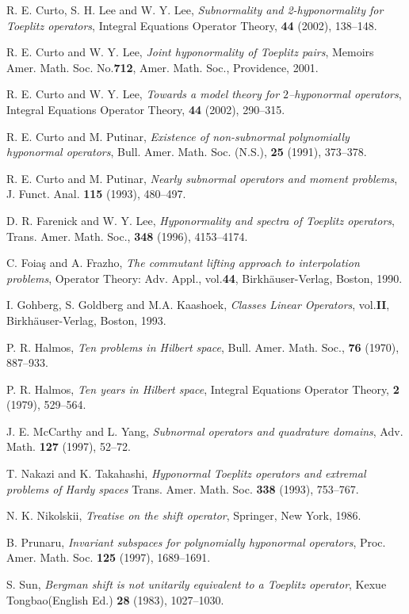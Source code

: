 \documentclass[12pt,a4paper,2sided]{article}
\begin{document}
\begin{thebibliography}{99}
\newpage  {}

\vspace{.4 cm}

 R. E. Curto, S. H. Lee and W. Y. Lee, {\it Subnormality and 2-hyponormality for Toeplitz operators},
Integral Equations Operator Theory, {\bf 44} (2002), 138--148.


 R. E. Curto and W. Y. Lee, {\it Joint hyponormality of Toeplitz pairs},
Memoirs Amer. Math. Soc. No.{\bf 712}, Amer. Math. Soc., Providence,
2001.

 R. E. Curto and W. Y. Lee, {\it Towards a model theory for $2$--hyponormal operators},
Integral Equations Operator Theory, {\bf 44} (2002), 290--315.

 R. E. Curto and M. Putinar, {\it Existence of non-subnormal polynomially hyponormal operators},
Bull. Amer. Math. Soc. (N.S.), {\bf 25} (1991), 373--378.

 R. E. Curto and M. Putinar, {\it Nearly subnormal operators and moment problems},
J. Funct. Anal. {\bf 115} (1993), 480--497.

 D. R. Farenick and W. Y. Lee, {\it Hyponormality and spectra of Toeplitz operators},
Trans. Amer. Math. Soc., {\bf 348} (1996), 4153--4174.

 C. Foia\c s and A. Frazho, {\it The commutant lifting approach to
interpolation problems}, Operator Theory: Adv. Appl., vol.{\bf 44},
Birkh\" auser-Verlag, Boston, 1990.

 I. Gohberg, S. Goldberg and M.A. Kaashoek, {\it Classes Linear Operators},
vol.{\bf II}, Birkh\" auser-Verlag, Boston, 1993.

 P. R. Halmos, {\it Ten problems in Hilbert space},
Bull. Amer. Math. Soc., {\bf 76} (1970), 887--933.

 P. R. Halmos, {\it Ten years in Hilbert space},
Integral Equations Operator Theory, {\bf 2} (1979), 529--564.

 J. E. McCarthy and L. Yang, {\it Subnormal operators and quadrature domains},
Adv. Math. {\bf 127} (1997), 52--72.

 T. Nakazi and K. Takahashi, {\it Hyponormal Toeplitz operators and extremal problems of Hardy spaces}
Trans. Amer. Math. Soc. {\bf 338} (1993), 753--767.

 N. K. Nikolskii, {\it Treatise on the shift operator}, Springer, New York, 1986.

 B. Prunaru, {\it Invariant subspaces for polynomially hyponormal operators},
Proc. Amer. Math. Soc. {\bf 125} (1997), 1689--1691.

 S. Sun, {\it Bergman shift is not unitarily equivalent to a Toeplitz operator},
Kexue Tongbao(English Ed.) {\bf 28} (1983), 1027--1030.


\end{thebibliography}
\end{document}
